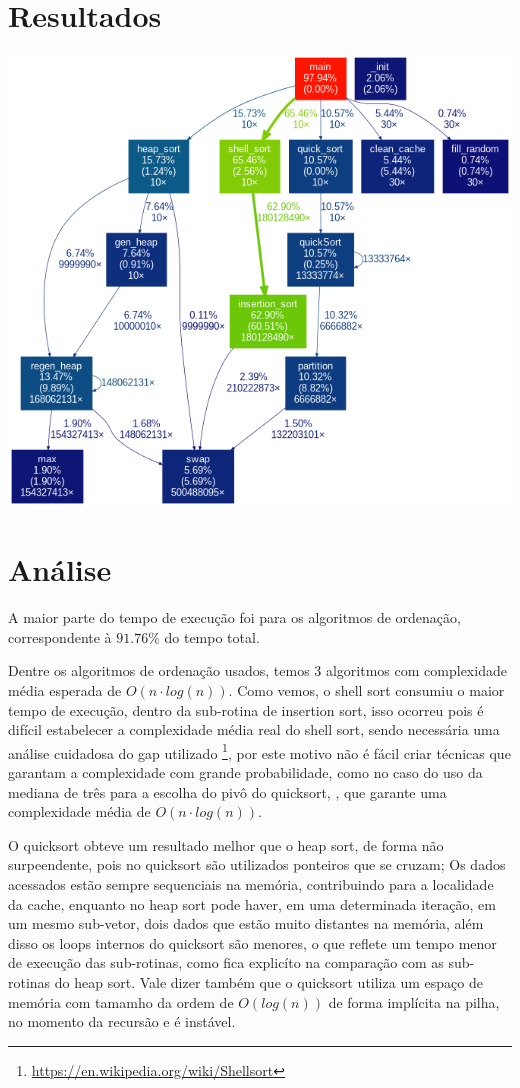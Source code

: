 \documentclass{article}
\begin{document}
\section{Resultados}
\centerline{\includegraphics[width=1.4\textwidth]{data/graph.png}}

\newpage
\section{Análise}
A maior parte do tempo de execução foi para os algoritmos de ordenação, correspondente à \(91.76\%\) do tempo total. 

Dentre os algoritmos de ordenação usados, temos 3 algoritmos com complexidade média esperada de \(O(n\cdot log(n))\).
Como vemos, o shell sort consumiu o maior tempo de execução, dentro da sub-rotina de insertion sort, isso ocorreu pois é difícil estabelecer a complexidade média real do shell sort, sendo necessária uma análise cuidadosa do gap utilizado \footnote{\url{https://en.wikipedia.org/wiki/Shellsort}}, por este motivo não é fácil criar técnicas que garantam a complexidade com grande probabilidade, como no caso do uso da mediana de três para a escolha do pivô do quicksort, \citep{leiserson1994introduction}, que garante uma complexidade média de \(O(n\cdot log(n))\). 

O quicksort obteve um resultado melhor que o heap sort, de forma não surpeendente, pois no quicksort são utilizados ponteiros que se cruzam; Os dados acessados estão sempre sequenciais na memória, contribuindo para a localidade da cache, enquanto no heap sort pode haver, em uma determinada iteração, em um mesmo sub-vetor, dois dados que estão muito distantes na memória, além disso os loops internos do quicksort são menores, o que reflete um tempo menor de execução das sub-rotinas, como fica explicíto na comparação com as sub-rotinas do heap sort. Vale dizer também que o quicksort utiliza um espaço de memória com tamamho da ordem de \(O(log(n))\) de forma implícita na pilha, no momento da recursão e é instável.
\end{document}
